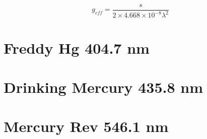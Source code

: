 \documentclass{article}
\title{}
\author{}
\date{}
\begin{document}
\begin{equation} {g_{eff} = \frac{s}{2\times4.668\times10^{-8}\lambda^2}} \end{equation}
 
 \section*{Freddy Hg 404.7 nm}
 
 \section*{Drinking Mercury 435.8 nm}
 
 \section*{Mercury Rev 546.1 nm}
\end{document}
